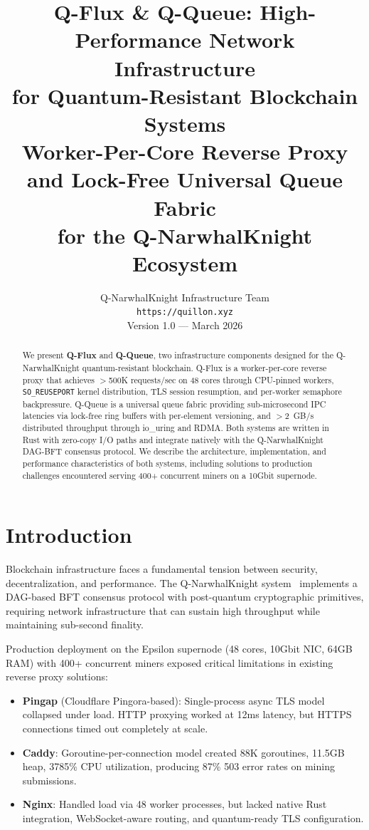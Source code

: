 \documentclass[11pt,a4paper,twocolumn]{article}
\title{%
\textbf{Q-Flux \& Q-Queue: High-Performance Network Infrastructure\\for Quantum-Resistant Blockchain Systems}\\[0.5em]
\large Worker-Per-Core Reverse Proxy and Lock-Free Universal Queue Fabric\\for the Q-NarwhalKnight Ecosystem
}
\author{%
Q-NarwhalKnight Infrastructure Team\\
\texttt{https://quillon.xyz}\\[0.3em]
\small Version 1.0 --- March 2026
}
\date{}
\begin{document}
\maketitle

\begin{abstract}
We present \textbf{Q-Flux} and \textbf{Q-Queue}, two infrastructure components designed for the Q-NarwhalKnight quantum-resistant blockchain. Q-Flux is a worker-per-core reverse proxy that achieves $>$500K requests/sec on 48 cores through CPU-pinned workers, \texttt{SO\_REUSEPORT} kernel distribution, TLS session resumption, and per-worker semaphore backpressure. Q-Queue is a universal queue fabric providing sub-microsecond IPC latencies via lock-free ring buffers with per-element versioning, and $>$2~GB/s distributed throughput through io\_uring and RDMA. Both systems are written in Rust with zero-copy I/O paths and integrate natively with the Q-NarwhalKnight DAG-BFT consensus protocol. We describe the architecture, implementation, and performance characteristics of both systems, including solutions to production challenges encountered serving 400+ concurrent miners on a 10Gbit supernode.
\end{abstract}

\section{Introduction}

Blockchain infrastructure faces a fundamental tension between security, decentralization, and performance. The Q-NarwhalKnight system~\cite{qnk-yellow} implements a DAG-based BFT consensus protocol with post-quantum cryptographic primitives, requiring network infrastructure that can sustain high throughput while maintaining sub-second finality.

Production deployment on the Epsilon supernode (48 cores, 10Gbit NIC, 64GB RAM) with 400+ concurrent miners exposed critical limitations in existing reverse proxy solutions:

\begin{itemize}[nosep]
\item \textbf{Pingap} (Cloudflare Pingora-based): Single-process async TLS model collapsed under load. HTTP proxying worked at 12ms latency, but HTTPS connections timed out completely at scale.
\item \textbf{Caddy}: Goroutine-per-connection model created 88K goroutines, 11.5GB heap, 3785\% CPU utilization, producing 87\% 503 error rates on mining submissions.
\item \textbf{Nginx}: Handled load via 48 worker processes, but lacked native Rust integration, WebSocket-aware routing, and quantum-ready TLS configuration.
\end{itemize}
\end{document}
